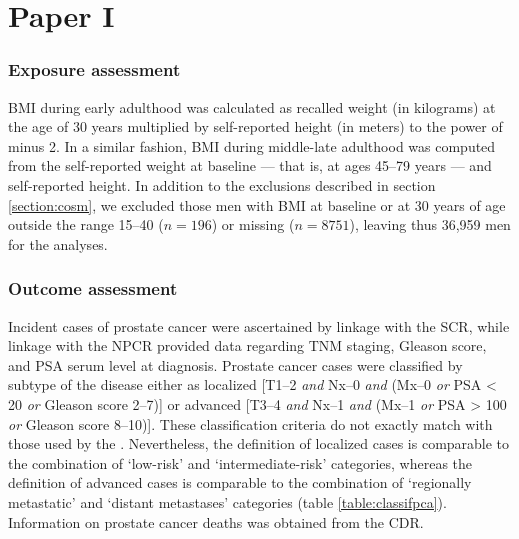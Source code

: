 %


\section{Paper I}

\subsubsection{Exposure assessment}

BMI during early adulthood was calculated as recalled weight (in kilograms) at the age of 30 years multiplied by self-reported height (in meters) to the power of minus 2. In a similar fashion, BMI during middle-late adulthood was computed from the self-reported weight at baseline --- that is, at ages 45--79 years --- and self-reported height. In addition to the exclusions described in section \ref{section:cosm}, we excluded those men with  BMI at baseline or at 30 years of age outside the range 15--40 \kgmsq{} ($n=196$) or missing ($n=8751$), leaving thus 36,959 men for the analyses. 

\subsubsection{Outcome assessment}

Incident cases of prostate cancer were ascertained by linkage with the SCR, while linkage with the NPCR provided data regarding TNM staging, Gleason score, and PSA serum level at diagnosis. Prostate cancer cases were classified by subtype of the disease either as localized [T1--2 \textit{and} Nx--0 \textit{and} (Mx--0 \textit{or} PSA < 20 \ngml{} \textit{or} Gleason score 2--7)] or advanced [T3--4 \textit{and} Nx--1 \textit{and} (Mx--1 \textit{or} PSA > 100 \ngml{} \textit{or} Gleason score 8--10)]. These classification criteria do not exactly match with those used by the \citet{npcr_prostatacancer_2013}. Nevertheless, the definition of localized cases is comparable to the combination of `low-risk' and `intermediate-risk' categories, whereas the definition of advanced cases is comparable to the combination of `regionally metastatic' and `distant metastases' categories (table \ref{table:classifpca}). Information on prostate cancer deaths was obtained from the CDR.

